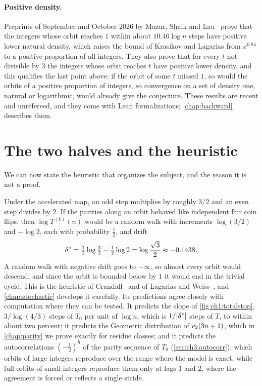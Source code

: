 \paragraph{Positive density.} Preprints of September and October 2026 by Mazur, Shaik and Lau~\cite{mazur2026pred,mazur2026time,shaik2026,lau2026} prove that the integers whose orbit reaches $1$ within about $10.46\log n$ steps have positive lower natural density, which raises the bound of Krasikov and Lagarias from $x^{0.84}$ to a positive proportion of all integers. They also prove that for every $t$ not divisible by $3$ the integers whose orbit reaches $t$ have positive lower density, and this qualifies the last point above: if the orbit of some $t$ missed $1$, so would the orbits of a positive proportion of integers, so convergence on a set of density one, natural or logarithmic, would already give the conjecture. These results are recent and unrefereed, and they come with Lean formalizations; \cref{chap:backward} describes them.

\section{The two halves and the heuristic}\label{sec:ch1:heuristic}

We can now state the heuristic that organizes the subject, and the reason it is
not a proof.

Under the accelerated map, an odd step multiplies by roughly $3/2$ and an even
step divides by $2$. If the parities along an orbit behaved like independent
fair coin flips, then $\log T^{(k)}(n)$ would be a random walk with increments
$\log(3/2)$ and $-\log2$, each with probability $\tfrac12$, and drift
\[
  \delta^{*}=\tfrac12\log\tfrac32-\tfrac12\log2=\log\frac{\sqrt3}{2}\approx-0.1438.
\]
A random walk with negative drift goes to $-\infty$, so almost every orbit
would descend, and since the orbit is bounded below by $1$ it would end in the
trivial cycle. This is the heuristic of Crandall~\cite{crandall1978} and of
Lagarias and
Weiss~\cite{lagarias1992}, and \cref{chap:stochastic} develops it
carefully. Its predictions agree closely with computation where they can be tested. It predicts the slope of \cref{fig:ch1:totalstop}, $3/\log(4/3)$ steps of $T_0$ per unit of $\log n$, which is $1/|\delta^{*}|$ steps of $T$, to within about two percent; it predicts the Geometric distribution of $v_2(3n+1)$, which in \cref{chap:parity} we prove exactly for residue classes; and it predicts the autocorrelations $(-\tfrac12)^h$ of the parity sequence of $T_0$ (\cref{sec:ch3:autocorr}), which orbits of large integers reproduce over the range where the model is exact, while full orbits of small integers reproduce them only at lags $1$ and $2$, where the agreement is forced or reflects a single stride.

